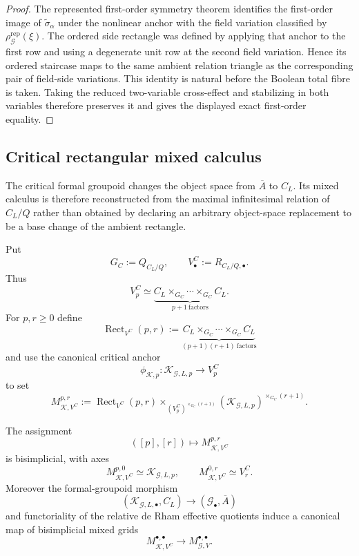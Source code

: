 \begin{proof}
The represented first-order symmetry theorem identifies the first-order image of
$\widetilde\sigma_\alpha$ under the nonlinear anchor with the field variation
classified by $\rho_{\mathcal G}^{\mathrm{rep}}(\xi)$.  The ordered side rectangle
was defined by applying that anchor to the first row and using a degenerate unit
row at the second field variation.  Hence its ordered staircase maps to the same
ambient relation triangle as the corresponding pair of field-side variations.
This identity is natural before the Boolean total fibre is taken.  Taking the
reduced two-variable cross-effect and stabilizing in both variables therefore
preserves it and gives the displayed exact first-order equality.
\end{proof}

\subsection{Critical rectangular mixed calculus}
\label{subsec:symmetry-noether-critical-rectangular-mixed-calculus}

The critical formal groupoid changes the object space from $\overline A$ to
$C_L$.  Its mixed calculus is therefore reconstructed from the maximal
infinitesimal relation of $C_L/Q$ rather than obtained by declaring an arbitrary
object-space replacement to be a base change of the ambient rectangle.

Put
\[
G_C:=Q_{C_L/Q},
\qquad
V^C_\bullet:=R_{C_L/Q,\bullet}.
\]
Thus
\[
V^C_p\simeq
\underbrace{
C_L\times_{G_C}\cdots\times_{G_C}C_L
}_{p+1\ \mathrm{factors}}.
\]
For $p,r\ge0$ define
\[
\operatorname{Rect}_{V^C}(p,r)
:=
\underbrace{
C_L\times_{G_C}\cdots\times_{G_C}C_L
}_{(p+1)(r+1)\ \mathrm{factors}}
\]
and use the canonical critical anchor
\[
\phi_{\mathcal K,p}:
\mathcal K_{\mathcal G,L,p}\longrightarrow V^C_p
\]
to set
\[
\boxed{
M_{\mathcal K,V^C}^{p,r}
:=
\operatorname{Rect}_{V^C}(p,r)
\times_{(V^C_p)^{\times_{G_C}(r+1)}}
(\mathcal K_{\mathcal G,L,p})^{\times_{G_C}(r+1)}.
}
\]

\begin{proposition}
\label{prop:symmetry-noether-critical-mixed-grid-functoriality}
The assignment
\[
([p],[r])\longmapsto M_{\mathcal K,V^C}^{p,r}
\]
is bisimplicial, with axes
\[
M_{\mathcal K,V^C}^{p,0}\simeq\mathcal K_{\mathcal G,L,p},
\qquad
M_{\mathcal K,V^C}^{0,r}\simeq V^C_r.
\]
Moreover the formal-groupoid morphism
\[
(\mathcal K_{\mathcal G,L,\bullet},C_L)
\longrightarrow
(\mathcal G_\bullet,\overline A)
\]
and functoriality of the relative de Rham effective quotients induce a canonical map
of bisimplicial mixed grids
\[
\boxed{
M_{\mathcal K,V^C}^{\bullet,\bullet}
\longrightarrow
M_{\mathcal G,V}^{\bullet,\bullet}.
}
\]
\end{proposition}

